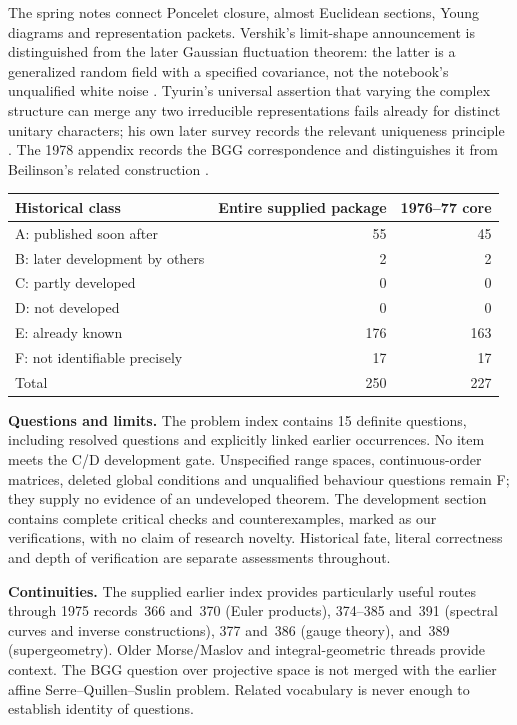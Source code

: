 The spring notes connect Poncelet closure, almost Euclidean sections,
Young diagrams and representation packets. Vershik's limit-shape
announcement is distinguished from the later Gaussian fluctuation theorem:
the latter is a generalized random field with a specified covariance,
not the notebook's unqualified white noise
\citep[\S7]{ivanovolshanski2002kerov}. Tyurin's universal assertion that
varying the complex structure can merge any two irreducible representations
fails already for distinct unitary characters; his own later survey records
the relevant uniqueness principle
\citep[Ch.~II, \S2, Exercise~10]{tyurin1978periods}. The 1978 appendix
records the BGG correspondence and distinguishes it from Beilinson's
related construction \citep{bernsteingelfandgelfand1978bundles,beilinson1978coherent}.

\begin{center}
\small
\begin{tabular}{lrr}
\hline
Historical class & Entire supplied package & 1976--77 core\\
\hline
A: published soon after & 55 & 45\\
B: later development by others & 2 & 2\\
C: partly developed & 0 & 0\\
D: not developed & 0 & 0\\
E: already known & 176 & 163\\
F: not identifiable precisely & 17 & 17\\
\hline
Total & 250 & 227\\
\hline
\end{tabular}
\end{center}

\textbf{Questions and limits.} The problem index contains 15
definite questions, including resolved questions and explicitly linked
earlier occurrences. No item meets the C/D development gate. Unspecified
range spaces, continuous-order matrices, deleted global conditions and
unqualified behaviour questions remain F; they supply no evidence of an
undeveloped theorem. The development section contains complete critical
checks and counterexamples, marked as our verifications, with no claim
of research novelty. Historical fate, literal correctness and depth of
verification are separate assessments throughout.

\textbf{Continuities.} The supplied earlier index provides particularly
useful routes through 1975 records~366 and~370 (Euler products), 374--385
and~391 (spectral curves and inverse constructions), 377 and~386 (gauge
theory), and~389 (supergeometry). Older Morse/Maslov and integral-geometric
threads provide context. The BGG question over projective space is not
merged with the earlier affine Serre--Quillen--Suslin problem. Related
vocabulary is never enough to establish identity of questions.
